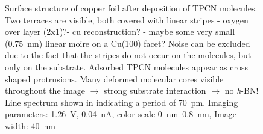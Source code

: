 \begin{figure}\centering
	 \quad
	\caption{Surface structure of copper foil after deposition of TPCN molecules. Two terraces are visible, both covered with linear stripes - oxygen over layer (2x1)?- cu reconstruction? - maybe some very small (\SI{0.75}{\nm}) linear moire on a Cu(100) facet? Noise can be excluded due to the fact that the stripes do not occur on the molecules, but only on the substrate. Adsorbed TPCN molecules appear as cross shaped protrusions. Many deformed molecular cores visible throughout the image $\rightarrow$ strong substrate interaction $\rightarrow$ no \textit{h}-BN! Line spectrum shown in  indicating a period of \SI{70}{\pico \meter}. Imaging parameters: 		
		\SI{1.26}{\volt}, \SI{0.04}{\nano\ampere}, 
		color scale \SIrange{0}{0.8}{\nano \meter}, 
		Image width: \SI{40}{\nano \meter} }
	\label{fig:tpcn-on-cu-foil}
\end{figure}

